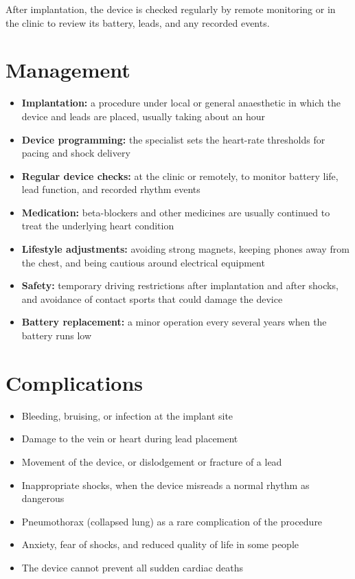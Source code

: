 After implantation, the device is checked regularly by remote monitoring or in the clinic to review its battery, leads, and any recorded events.

\section*{Management}
\begin{itemize}
    \item \textbf{Implantation:} a procedure under local or general anaesthetic in which the device and leads are placed, usually taking about an hour
    \item \textbf{Device programming:} the specialist sets the heart-rate thresholds for pacing and shock delivery
    \item \textbf{Regular device checks:} at the clinic or remotely, to monitor battery life, lead function, and recorded rhythm events
    \item \textbf{Medication:} beta-blockers and other medicines are usually continued to treat the underlying heart condition
    \item \textbf{Lifestyle adjustments:} avoiding strong magnets, keeping phones away from the chest, and being cautious around electrical equipment
    \item \textbf{Safety:} temporary driving restrictions after implantation and after shocks, and avoidance of contact sports that could damage the device
    \item \textbf{Battery replacement:} a minor operation every several years when the battery runs low
\end{itemize}

\section*{Complications}
\begin{itemize}
    \item Bleeding, bruising, or infection at the implant site
    \item Damage to the vein or heart during lead placement
    \item Movement of the device, or dislodgement or fracture of a lead
    \item Inappropriate shocks, when the device misreads a normal rhythm as dangerous
    \item Pneumothorax (collapsed lung) as a rare complication of the procedure
    \item Anxiety, fear of shocks, and reduced quality of life in some people
    \item The device cannot prevent all sudden cardiac deaths
\end{itemize}

